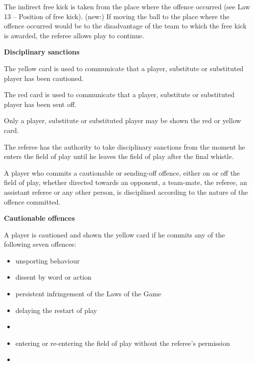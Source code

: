 The indirect free kick is taken from the place where the offence occurred (see Law 13 -- Position of free kick). (new:) If moving the ball to the place where the offence occurred would be to the disadvantage of the team to which the free kick is awarded, the referee allows play to continue.

\bigskip

{\bfseries Disciplinary sanctions}

\headlinebox

The yellow card is used to communicate that a player, substitute or substituted player has been cautioned.

\bigskip

The red card is used to communicate that a player, substitute or substituted player has been sent off.

\bigskip

Only a player, substitute or substituted player may be shown the red or yellow card.

\bigskip

The referee has the authority to take disciplinary sanctions from the moment he enters the field of play until he leaves the field of play after the final whistle. 

\bigskip

A player who commits a cautionable or sending-off offence, either on or off the field of play, whether directed towards an opponent, a team-mate, the referee, an assistant referee or any other person, is disciplined according to the nature of the offence committed.

\bigskip

{\bfseries Cautionable offences }

\headlinebox

A player is cautioned and shown the yellow card if he commits any of the following seven offences: 

\begin{itemize}
\item unsporting behaviour
\item dissent by word or action
\item persistent infringement of the Laws of the Game
\item delaying the restart of play
\item {}
\item entering or re-entering the field of play without the referee's permission
\item {}
\end{itemize}

